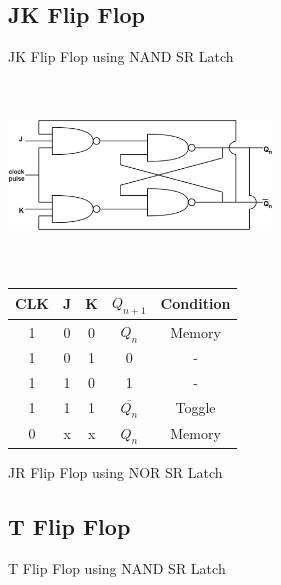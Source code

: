 \documentclass[journal,12pt,twocolumn]{IEEEtran}
\begin{document}
\subsection{JK Flip Flop}
\problem JK Flip Flop using NAND SR Latch

\vspace{0.5cm}
\includegraphics[width = 7cm, height = 5cm]{img/JK-flip-flop}
\begin{table}[h!]
\centering
\begin{tabular}{|c|cc|c|c|}
\hline
CLK	&	J	&	K	&	$Q_{n+1}$		& Condition \\\hline
1	&	0	&	0	&	 $Q_n$		&	Memory		\\\hline
1	&	0	&	1	&	0		&		-	\\\hline
1	&	1	&	0	&	1		&		-	\\\hline
1	&	1	&	1	&	$\overline{Q_n}$&	Toggle		\\\hline	
0	&	x	&	x	&	 $Q_n$		   &	Memory		\\\hline
\end{tabular}
\end{table}

\problem JR Flip Flop using NOR SR Latch
\subsection{T Flip Flop}
\problem T Flip Flop using NAND SR Latch
\end{document}
